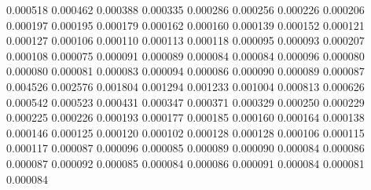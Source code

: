 0.000518
0.000462
0.000388
0.000335
0.000286
0.000256
0.000226
0.000206
0.000197
0.000195
0.000179
0.000162
0.000160
0.000139
0.000152
0.000121
0.000127
0.000106
0.000110
0.000113
0.000118
0.000095
0.000093
0.000207
0.000108
0.000075
0.000091
0.000089
0.000084
0.000084
0.000096
0.000080
0.000080
0.000081
0.000083
0.000094
0.000086
0.000090
0.000089
0.000087
0.004526
0.002576
0.001804
0.001294
0.001233
0.001004
0.000813
0.000626
0.000542
0.000523
0.000431
0.000347
0.000371
0.000329
0.000250
0.000229
0.000225
0.000226
0.000193
0.000177
0.000185
0.000160
0.000164
0.000138
0.000146
0.000125
0.000120
0.000102
0.000128
0.000128
0.000106
0.000115
0.000117
0.000087
0.000096
0.000085
0.000089
0.000090
0.000084
0.000086
0.000087
0.000092
0.000085
0.000084
0.000086
0.000091
0.000084
0.000081
0.000084
